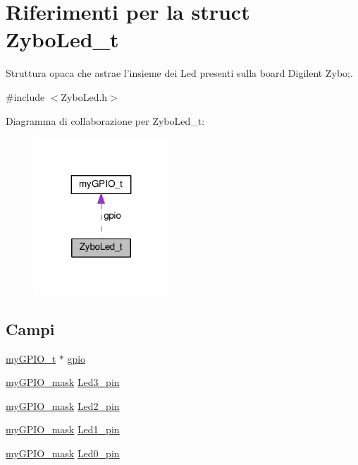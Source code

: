 \hypertarget{struct_zybo_led__t}{\section{Riferimenti per la struct Zybo\+Led\+\_\+t}
\label{struct_zybo_led__t}
}


Struttura opaca che astrae l'insieme dei Led presenti sulla board Digilent Zybo;.  




{\ttfamily \#include $<$Zybo\+Led.\+h$>$}



Diagramma di collaborazione per Zybo\+Led\+\_\+t\+:\nopagebreak
\begin{figure}[H]
\begin{center}
\leavevmode
\includegraphics[width=143pt]{struct_zybo_led__t__coll__graph}
\end{center}
\end{figure}
\subsection*{Campi}
\begin{DoxyCompactItemize}
\item 
\hyperlink{structmy_g_p_i_o__t}{my\+G\+P\+I\+O\+\_\+t} $\ast$ \hyperlink{struct_zybo_led__t_ac37ddc7c58d246d233dfb38037020184}{gpio}
\item 
\hyperlink{group__bare-metal_ga402a0d20afc0cb7c25554b8b023f4253}{my\+G\+P\+I\+O\+\_\+mask} \hyperlink{struct_zybo_led__t_afc64d1407f30615e374bf9f06721842a}{Led3\+\_\+pin}
\item 
\hyperlink{group__bare-metal_ga402a0d20afc0cb7c25554b8b023f4253}{my\+G\+P\+I\+O\+\_\+mask} \hyperlink{struct_zybo_led__t_a4213c78e5a02b1476222e989c2eceb04}{Led2\+\_\+pin}
\item 
\hyperlink{group__bare-metal_ga402a0d20afc0cb7c25554b8b023f4253}{my\+G\+P\+I\+O\+\_\+mask} \hyperlink{struct_zybo_led__t_adc78fb167f1dd6693910813d4ec5930e}{Led1\+\_\+pin}
\item 
\hyperlink{group__bare-metal_ga402a0d20afc0cb7c25554b8b023f4253}{my\+G\+P\+I\+O\+\_\+mask} \hyperlink{struct_zybo_led__t_ac5afef2eef91d5533a23435cfcc60104}{Led0\+\_\+pin}
\end{DoxyCompactItemize}


